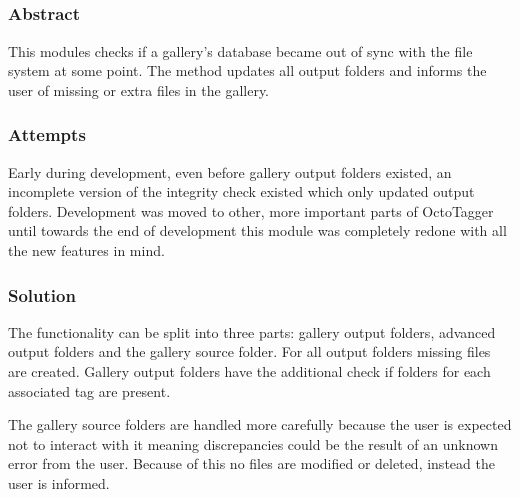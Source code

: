 \subsection{}
\def\kapitelautor{Clemens Stadlbauer}

\subsubsection{Abstract}

This modules checks if a gallery's database became out of sync with the file
system at some point. The  method updates all output folders and
informs the user of missing or extra files in the gallery.

\subsubsection{Attempts}

Early during development, even before gallery output folders existed, an
incomplete version of the integrity check existed which only updated output
folders. Development was moved to other, more important parts of OctoTagger
until towards the end of development this module was completely redone with all
the new features in mind.

\subsubsection{Solution} %

The functionality can be split into three parts: gallery output folders,
advanced output folders and the gallery source folder. For all output folders
missing files are created. Gallery output folders have the additional check if
folders for each associated tag are present.

The gallery source folders are handled more carefully because the user is
expected not to interact with it meaning discrepancies could be the result of
an unknown error from the user. Because of this no files are modified or
deleted, instead the user is informed.

